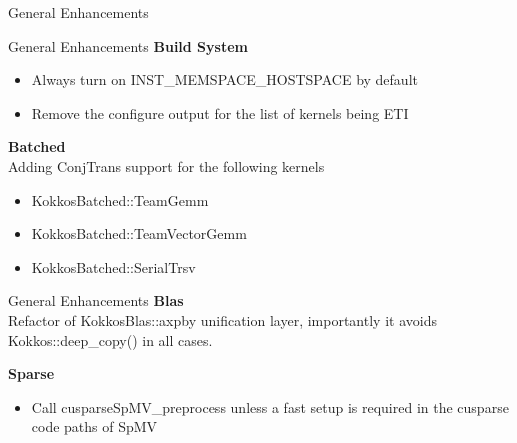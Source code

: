 \begin{frame}[fragile]

  {\Huge General Enhancements}

  \vspace{10pt}

\end{frame}

\begin{frame}[fragile]{General Enhancements}
  \textbf{Build System}
  \begin{itemize}
  \item Always turn on {\ttfamily INST\_MEMSPACE\_HOSTSPACE} by default
  \item Remove the configure output for the list of kernels being ETI
  \end{itemize}\vspace{1em}

  \textbf{Batched}\\
  Adding {\ttfamily ConjTrans} support for the following kernels
  \begin{itemize}
  \item {\ttfamily KokkosBatched::TeamGemm}
  \item {\ttfamily KokkosBatched::TeamVectorGemm}
  \item {\ttfamily KokkosBatched::SerialTrsv}
  \end{itemize}
\end{frame}

\begin{frame}[fragile]{General Enhancements}
  \textbf{Blas}\\
  Refactor of {\ttfamily KokkosBlas::axpby} unification layer, importantly it avoids {\ttfamily Kokkos::deep\_copy()} in all cases.\\\vspace{1em}

  \textbf{Sparse}
  \begin{itemize}
  \item Call {\ttfamily cusparseSpMV\_preprocess} unless a fast setup is required in the cusparse code paths of SpMV
  \end{itemize}
  
\end{frame}



